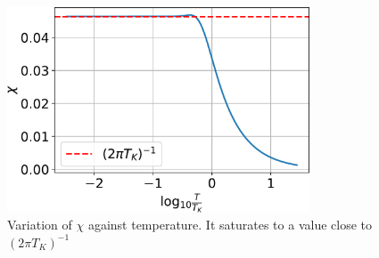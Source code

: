 \documentclass[12pt,twoside]{report}
\numberwithin{equation}{section}
\begin{document}
\begin{figure}[htpb]
	\centering
	\includegraphics[width=0.8\textwidth]{../figures/chi.pdf}
	\caption{Variation of $\chi$ against temperature. It saturates to a value close to \(\left( 2\pi T_K \right) ^{-1}\)}
\end{figure}
\end{document}
